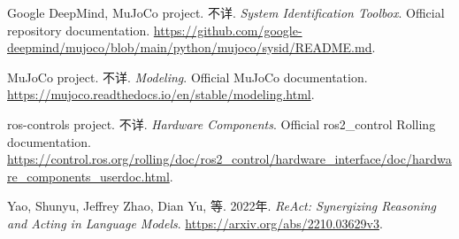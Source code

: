 \documentclass[
  chinese,
  11pt,
  a4paper,
  fontset=fandol]{ctexart}
\newlength{\cslhangindent}
\newenvironment{CSLReferences}[2] %
 {\begin{list}{}{%
  \setlength{\itemindent}{0pt}
  \setlength{\leftmargin}{0pt}
  \setlength{\parsep}{0pt}
  \ifodd #1
   \setlength{\leftmargin}{\cslhangindent}
   \setlength{\itemindent}{-1\cslhangindent}
  \fi
  \setlength{\itemsep}{#2\baselineskip}}}
 {\end{list}}
\begin{document}
\protect{}\label{refs}
\begin{CSLReferences}{1}{1}
Google DeepMind, MuJoCo project. 不详. \emph{System Identification
Toolbox}. Official repository documentation.
\url{https://github.com/google-deepmind/mujoco/blob/main/python/mujoco/sysid/README.md}.

MuJoCo project. 不详. \emph{Modeling}. Official MuJoCo documentation.
\url{https://mujoco.readthedocs.io/en/stable/modeling.html}.

{ros-controls project}. 不详. \emph{Hardware Components}. Official
ros2\_control Rolling documentation.
\url{https://control.ros.org/rolling/doc/ros2_control/hardware_interface/doc/hardware_components_userdoc.html}.

Yao, Shunyu, Jeffrey Zhao, Dian Yu, 等. 2022年. \emph{ReAct: Synergizing
Reasoning and Acting in Language Models}.
\url{https://arxiv.org/abs/2210.03629v3}.

\end{CSLReferences}
\end{document}
